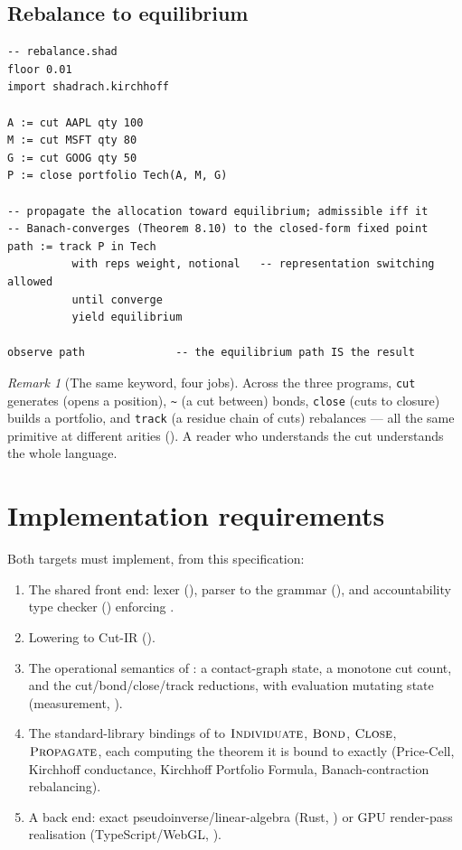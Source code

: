 \documentclass[11pt,a4paper]{article}
\theoremstyle{thmstyle}
\theoremstyle{definition}
\theoremstyle{remark}
\newtheorem{remark}[theorem]{Remark}
\newcommand{\sh}[1]{\texttt{#1}}
\begin{document}
\subsection{Rebalance to equilibrium}

\begin{lstlisting}[caption={Tracking a portfolio's rebalancing path to the Banach fixed point.}]
-- rebalance.shad
floor 0.01
import shadrach.kirchhoff

A := cut AAPL qty 100
M := cut MSFT qty 80
G := cut GOOG qty 50
P := close portfolio Tech(A, M, G)

-- propagate the allocation toward equilibrium; admissible iff it
-- Banach-converges (Theorem 8.10) to the closed-form fixed point
path := track P in Tech
          with reps weight, notional   -- representation switching allowed
          until converge
          yield equilibrium

observe path              -- the equilibrium path IS the result
\end{lstlisting}

\begin{remark}[The same keyword, four jobs]
\label{rem:same-keyword}
Across the three programs, \sh{cut} generates (opens a position),
\sh{\~{}} (a cut between) bonds, \sh{close} (cuts to closure) builds a
portfolio, and \sh{track} (a residue chain of cuts) rebalances --- all
the same primitive at different arities (). A reader
who understands the cut understands the whole language.
\end{remark}

\section{Implementation requirements}
\label{sec:impl}

Both targets must implement, from this specification:

\begin{enumerate}[leftmargin=1.6em,itemsep=2pt]
\item The shared front end: lexer (), parser to the
grammar (), and accountability type checker
() enforcing .
\item Lowering to Cut-IR ().
\item The operational semantics of : a contact-graph
state, a monotone cut count, and the cut/bond/close/track reductions,
with evaluation mutating state (measurement, ).
\item The standard-library bindings of  to
$\textsc{Individuate}$, $\textsc{Bond}$, $\textsc{Close}$,
$\textsc{Propagate}$, each computing the theorem it is bound to
exactly (Price-Cell, Kirchhoff conductance, Kirchhoff Portfolio
Formula, Banach-contraction rebalancing).
\item A back end: exact pseudoinverse/linear-algebra (Rust,
) or GPU render-pass realisation
(TypeScript/WebGL, ).
\end{enumerate}
\end{document}
